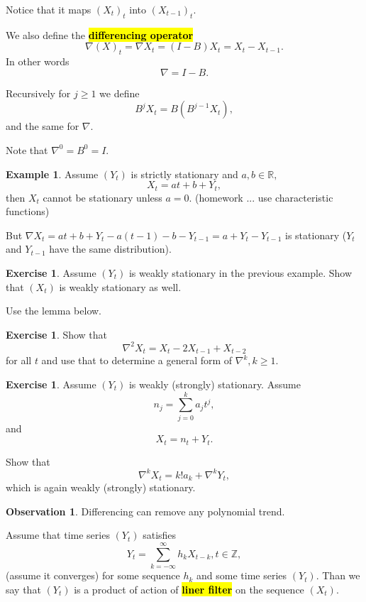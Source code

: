 \documentclass[12pt,a4paper, notitlepage]{book}
\newcommand{\hlc}[2][yellow]{ {\sethlcolor{#1} \hl{#2}} }
\newcommand{\hlcr}[1]{\hlc[lightred]{#1}}
\theoremstyle{definition} %
\newtheorem{example}[definition]{Example}
\newtheorem{exercise}[definition]{Exercise}
\newtheorem{observation}[definition]{Observation}
\theoremstyle{plain} %
\newcommand{\R}{\mathbb R}
\newcommand{\Z}{\mathbb Z}
\newcommand{\New}[1]{ {\bf \hlcr{#1} } }
\begin{document}
Notice that it maps $(X_t)_t$ into $(X_{t-1})_t$.

We also define the \New{ differencing operator} 
\[ \nabla(X)_t = \nabla X_t = (I - B) X_t = X_t - X_{t-1} . \]
 In other words
\[ \nabla = I - B . \]

Recursively for $j \geq 1$ we define 
\[ B^j X_t = B (B^{j-1} X_t) , \]
 and the same for $\nabla$.

Note that $\nabla^0 = B^0 = I$. 

\begin{example}
Assume $(Y_t)$ is strictly stationary and $a,b \in \R, $
\[ X_t = a t + b + Y_t, \]
 then $X_t$ cannot be stationary unless $a = 0$. (homework ... use characteristic functions)

But 
$\nabla X_t = at + b + Y_t - a(t-1) - b - Y_{t-1} = a + Y_t - Y_{t-1}$ is stationary ($Y_t$ and $Y_{t-1}$ have the same distribution).  
\end{example}


\begin{exercise}
Assume $(Y_t)$ is weakly stationary in the previous example. Show that $(X_t)$ is weakly stationary as well.

\end{exercise}
\begin{hint} Use the lemma below.
\end{hint}

\begin{exercise}
Show that
\[ \nabla^2 X_t = X_t - 2X_{t-1} + X_{t-2} \] 
 for all $t$ and use that to determine a general form of $\nabla^k, k \geq 1$.
\end{exercise}


\begin{exercise}
Assume $(Y_t)$ is weakly (strongly) stationary. Assume 
\[ n_j = \sum_{j=0}^k a_j t^j , \]
 and 
\[ X_t = n_t + Y_t . \]

Show that 
\[ \nabla^k X_t = k! a_k + \nabla^k Y_t , \]
 which is again weakly (strongly) stationary.  
\end{exercise}

\begin{observation}
Differencing can remove any polynomial trend. 
\end{observation}


Assume that time series $(Y_t)$ satisfies 
\[ Y_t = \sum_{k = -\infty}^\infty h_k X_{t-k}, t \in \Z , \]
 (assume it converges) for some sequence $h_k$ and some time series $(Y_t)$. Than we say that $(Y_t)$ is a product of action of \New{ liner filter} on the sequence $(X_t)$.  
\end{document}
